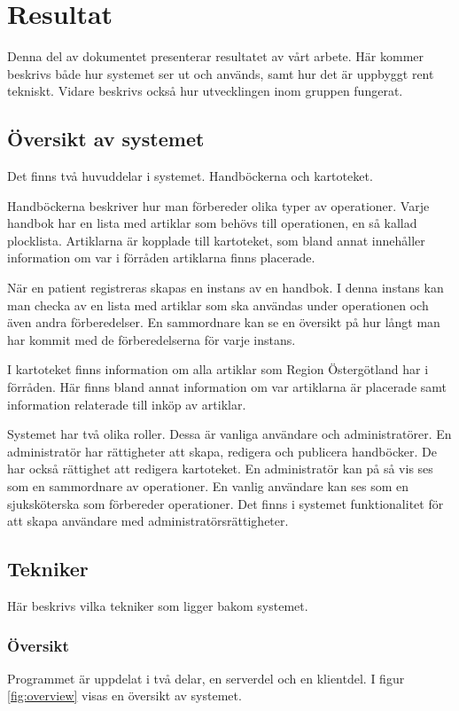 \section{Resultat}
Denna del av dokumentet presenterar resultatet av vårt arbete.
Här kommer beskrivs både hur systemet ser ut och används, samt hur det är uppbyggt rent tekniskt. Vidare beskrivs också hur utvecklingen inom gruppen fungerat.

\subsection{Översikt av systemet}
Det finns två huvuddelar i systemet. Handböckerna och kartoteket.

Handböckerna beskriver hur man förbereder olika typer av operationer.
Varje handbok har en lista med artiklar som behövs till operationen, en så kallad plocklista.
Artiklarna är kopplade till kartoteket, som bland annat innehåller information om var i förråden artiklarna finns placerade.

När en patient registreras skapas en instans av en handbok.
I denna instans kan man checka av en lista med artiklar som ska användas under operationen och även andra förberedelser.
En sammordnare kan se en översikt på hur långt man har kommit med de förberedelserna för varje instans.

I kartoteket finns information om alla artiklar som Region Östergötland har i förråden.
Här finns bland annat information om var artiklarna är placerade samt information relaterade till inköp av artiklar.

Systemet har två olika roller. Dessa är vanliga användare och administratörer. En administratör har rättigheter att skapa, redigera och publicera handböcker. De har också rättighet att redigera kartoteket. En administratör kan på så vis ses som en sammordnare av operationer. En vanlig användare kan ses som en sjuksköterska som förbereder operationer. Det finns i systemet funktionalitet för att skapa användare med administratörsrättigheter.

\subsection{Tekniker}
Här beskrivs vilka tekniker som ligger bakom systemet.

\subsubsection{Översikt}
Programmet är uppdelat i två delar, en serverdel och en klientdel. I figur \ref{fig:overview} visas en översikt av systemet.


